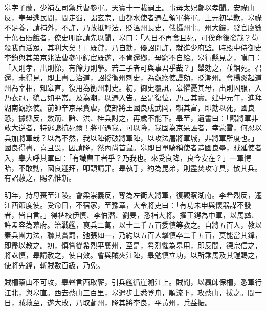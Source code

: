 \begin{pinyinscope}
 皋字子蘭，少補左司禦兵曹參軍。天寶十一載嗣王。事母太妃鄭以孝聞。安祿山反，奉母逃民間，間走蜀，謁玄宗，由都水使者遷左領軍將軍。上元初旱歉，皋祿不足養，請補外，不許，乃故抵輕法，貶溫州長史，俄攝州事。州大饑，發官廩數十萬石賑餓者，僚史叩庭請先以聞，皋曰：「人日不再食且死，可俟命後發哉？茍殺我而活眾，其利大矣！」既貸，乃自劾，優詔開許，就進少府監。時殿中侍御史李鈞與其弟京兆法曹參軍鍔宦既遂，不肯還鄉，母窮不自給。皋行縣見之，嘆曰：「入則孝，出則悌，有餘力則學。若二子者可與事君乎哉？」舉劾之，並錮死。召還，未得見，即上書言治道，詔授衡州刺史，為觀察使謾劾，貶潮州。會楊炎起道州為宰相，知皋直，復用為衡州刺史。初，御史覆訊，皋懼憂其母，出則囚服，入乃衣冠，貌言如平常。及為潮，以遷入告。至是復位，乃言其實。建中元年，進拜湖南觀察使。前帥辛京杲貪虐，使部將王國良戍武岡，賴其富，即劾以死，國良恐，據縣反，斂荊、黔、洪、桂兵討之，再歲不能下。皋至，遺書曰：「觀將軍非敢大逆者，特逃讒抗死爾！將軍遇我，可以降，我固為京杲誣者，幸蒙雪，何忍以兵加將軍哉？以為不然，我以陣術破將軍陣，以攻法屠將軍城，非將軍所度也。」國良得書，喜且畏，因請降，然內尚首鼠。皋即日單騎稱使者造國良壘，賊延使者入，皋大呼其軍曰：「有識曹王者乎？乃我也。來受良降，良今安在？」一軍愕眙，不敢動，國良迎拜，叩頭請罪。皋執手，約為昆弟，則盡焚攻守具，散其兵。有詔赦之，賜名惟新。



 明年，持母喪至江陵。會梁崇義反，奪為左衛大將軍，復觀察湖南。李希烈反，遷江西節度使。受命日，不宿家，至豫章，大令將吏曰：「有功未申與懷器謀不發者，皆自言。」得裨校伊慎、李伯潛、劉旻，悉補大將。擢王鍔為中軍，以馬彞、許孟容為幕府。治戰艦，裒兵二萬，以士二千五百委慎等教之。自將五百人，教以秦兵團力法，聯其賞罰，弛張如一，乃約以五百人擊慎卒二千五百，莫能當其鋒，即盡以教之。初，慎嘗從希烈平襄州，至是，希烈懼為皋用，即反間，德宗信之，將誅慎，皋請赦之，使自效。會與賊夾江陣，皋勉慎立功，以所乘馬及其鎧賜之，使將先鋒，斬賊數百級，乃免。



 賊柵蔡山不可攻，皋聲言西取蘄，引兵艦循崖溯江上。賊聞，以羸師保柵，悉軍行江北，與皋直。西去蔡山三百里，皋遣步士悉登舟，順流下，攻蔡山，拔之。間一日，賊救至，遂大敗，乃取蘄州，降其將李良，平黃州，兵益振。




\end{pinyinscope}
